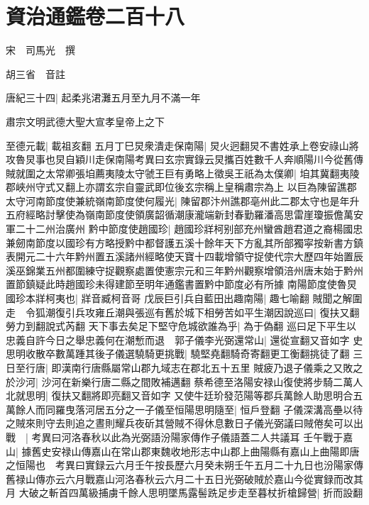 \section{資治通鑑卷二百十八}
宋　司馬光　撰

胡三省　音註

唐紀三十四|{
	起柔兆涒灘五月至九月不滿一年}


肅宗文明武德大聖大宣孝皇帝上之下

至德元載|{
	載祖亥翻}
五月丁巳炅衆潰走保南陽|{
	炅火迥翻炅不書姓承上卷安祿山將攻魯炅事也炅自穎川走保南陽考異曰玄宗實錄云炅攜百姓數千人奔順陽川今從舊傳}
賊就圍之太常卿張垍薦夷陵太守虢王巨有勇略上徵吳王祇為太僕卿|{
	垍其冀翻夷陵郡峽州守式又翻上亦謂玄宗自靈武即位後玄宗稱上皇稱肅宗為上}
以巨為陳留譙郡太守河南節度使兼統嶺南節度使何履光|{
	陳留郡汴州譙郡亳州此二郡太守也是年升五府經略討擊使為嶺南節度使領廣韶循潮康瀧端新封春勤羅潘高思雷崖瓊振儋萬安軍二十二州治廣州}
黔中節度使趙國珍|{
	趙國珍牂柯别部充州蠻酋趙君道之裔楊國忠兼劒南節度以國珍有方略授黔中都督護五溪十餘年天下方亂其所部獨寜按新書方鎮表開元二十六年黔州置五溪諸州經略使天寶十四載增領守捉使代宗大歷四年始置辰溪巫錦業五州都圍練守捉觀察處置使憲宗元和三年黔州觀察增領涪州唐末始于黔州置節鎮疑此時趙國珍未得建節至明年通鑑書置黔中節度必有所據}
南陽節度使魯炅國珍本牂柯夷也|{
	牂音臧柯音哥}
戊辰巨引兵自藍田出趣南陽|{
	趣七喻翻}
賊聞之解圍走　令狐潮復引兵攻雍丘潮與張巡有舊於城下相勞苦如平生潮因說巡曰|{
	復扶又翻勞力到翻說式芮翻}
天下事去矣足下堅守危城欲誰為乎|{
	為于偽翻}
巡曰足下平生以忠義自許今日之舉忠義何在潮慙而退　郭子儀李光弼還常山|{
	還從宣翻又音如字}
史思明收散卒數萬踵其後子儀選驍騎更挑戰|{
	驍堅堯翻騎奇寄翻更工衡翻挑徒了翻}
三日至行唐|{
	即漢南行唐縣屬常山郡九域志在郡北五十五里}
賊疲乃退子儀乘之又敗之於沙河|{
	沙河在新樂行唐二縣之間敗補邁翻}
蔡希德至洛陽安禄山復使將步騎二萬人北就思明|{
	復扶又翻將即亮翻又音如字}
又使牛廷玠發范陽等郡兵萬餘人助思明合五萬餘人而同羅曳落河居五分之一子儀至恒陽思明隨至|{
	恒戶登翻}
子儀深溝高壘以待之賊來則守去則追之晝則耀兵夜斫其營賊不得休息數日子儀光弼議曰賊倦矣可以出戰　|{
	考異曰河洛春秋以此為光弼語汾陽家傳作子儀語蓋二人共議耳}
壬午戰于嘉山|{
	據舊史安禄山傳嘉山在常山郡東魏收地形志中山郡上曲陽縣有嘉山上曲陽即唐之恒陽也　考異曰實録云六月壬午按長歷六月癸未朔壬午五月二十九日也汾陽家傳舊禄山傳亦云六月戰嘉山河洛春秋云六月二十五日光弼破賊於嘉山今從實録而改其月}
大破之斬首四萬級捕虜千餘人思明墜馬露髻跣足步走至暮杖折槍歸營|{
	折而設翻}

